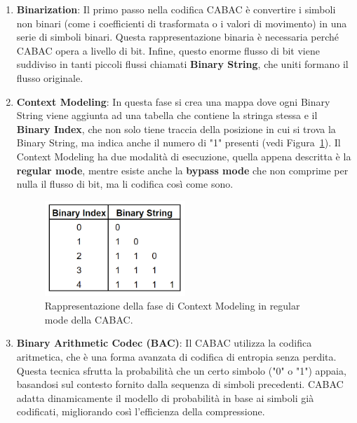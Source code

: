 \documentclass[a4paper,12pt, oneside]{article}
\begin{document}
\begin{enumerate}
    \item \textbf{Binarization}: Il primo passo nella codifica CABAC è convertire i simboli
    non binari (come i coefficienti di trasformata o i valori di movimento) in una serie di simboli binari.
    Questa rappresentazione binaria è necessaria perché CABAC opera a livello di bit. Infine, questo enorme
    flusso di bit viene suddiviso in tanti piccoli flussi chiamati \textbf{Binary String}, che uniti formano
    il flusso originale.
    \item \textbf{Context Modeling}: In questa fase si crea una mappa dove ogni Binary String viene
    aggiunta ad una tabella che contiene la stringa stessa e il \textbf{Binary Index}, che non solo
    tiene traccia della posizione in cui si trova la Binary String, ma indica anche il numero di "1"
    presenti (vedi Figura~\ref{fig:CABAC_regular}). Il Context Modeling ha due modalità di esecuzione,
    quella appena descritta è la \textbf{regular mode}, mentre esiste anche la \textbf{bypass mode}
    che non comprime per nulla il flusso di bit, ma li codifica così come sono.
    
    \begin{figure}[h]
        \centering
        \includegraphics[width=0.5\textwidth]{images/CABAC-regular.png}
        \caption{Rappresentazione della fase di Context Modeling in regular mode della CABAC.}
        \label{fig:CABAC_regular}
    \end{figure}
    
    \item \textbf{Binary Arithmetic Codec (BAC)}: Il CABAC utilizza la codifica aritmetica, che è una forma
    avanzata di codifica di entropia senza perdita. Questa tecnica sfrutta la probabilità che un certo simbolo
    ("0" o "1") appaia, basandosi sul contesto fornito dalla sequenza di simboli precedenti. CABAC adatta
    dinamicamente il modello di probabilità in base ai simboli già codificati, migliorando così l'efficienza
    della compressione.
\end{enumerate}
\end{document}
